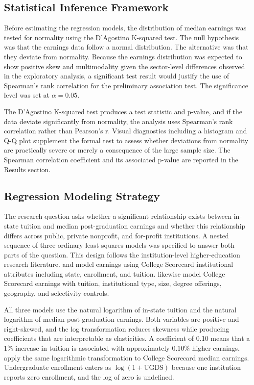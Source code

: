 \subsection{Statistical Inference Framework}

Before estimating the regression models, the distribution of median earnings was tested for normality using the D'Agostino K-squared test. The null hypothesis was that the earnings data follow a normal distribution. The alternative was that they deviate from normality. Because the earnings distribution was expected to show positive skew and multimodality given the sector-level differences observed in the exploratory analysis, a significant test result would justify the use of Spearman's rank correlation for the preliminary association test. The significance level was set at $\alpha = 0.05$.

The D'Agostino K-squared test produces a test statistic and p-value, and if the data deviate significantly from normality, the analysis uses Spearman's rank correlation rather than Pearson's r. Visual diagnostics including a histogram and Q-Q plot supplement the formal test to assess whether deviations from normality are practically severe or merely a consequence of the large sample size. The Spearman correlation coefficient and its associated p-value are reported in the Results section.

\subsection{Regression Modeling Strategy}

The research question asks whether a significant relationship exists between in-state tuition and median post-graduation earnings and whether this relationship differs across public, private nonprofit, and for-profit institutions. A nested sequence of three ordinary least squares models was specified to answer both parts of the question. This design follows the institution-level higher-education research literature. \textcite[pp.~41--45]{faber2017} and \textcite[pp.~687--700]{faber2021} model earnings using College Scorecard institutional attributes including state, enrollment, and tuition. \textcite[pp.~36--40]{muse2024} likewise model College Scorecard earnings with tuition, institutional type, size, degree offerings, geography, and selectivity controls.

All three models use the natural logarithm of in-state tuition and the natural logarithm of median post-graduation earnings. Both variables are positive and right-skewed, and the log transformation reduces skewness while producing coefficients that are interpretable as elasticities. A coefficient of 0.10 means that a 1\% increase in tuition is associated with approximately 0.10\% higher earnings. \textcite[pp.~37, 40]{muse2024} apply the same logarithmic transformation to College Scorecard median earnings. Undergraduate enrollment enters as $\log(1 + \text{UGDS})$ because one institution reports zero enrollment, and the log of zero is undefined.

